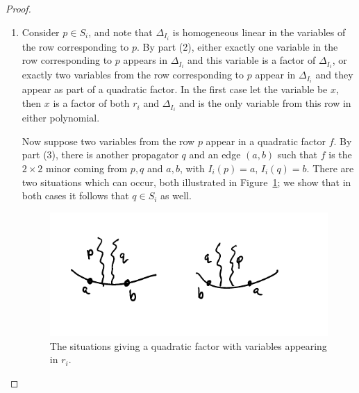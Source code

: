 \documentclass[11pt]{article}
\theoremstyle{remark}
\theoremstyle{definition}
\begin{document}
\begin{proof}
\begin{enumerate}
Now let $f$ be a quadratic factor of $\Delta_{I_i}$.  By part (2) we know that $f$ is a $2\times 2$ minor coming from two propagators, call them $p$ and $q$, and two vertices, call them $a <_i b$.  It remains to show that $a$ and $b$ are adjacent.  From this we can conclude that $p$ and $q$ each have one end on $(a,b)$, as any other way for both $p$ and $q$ to be supported on two consecutive vertices would contradict noncrossing or the density requirement of admissibility.

As in the proof of part (2), make a new admissible diagram by removing the propagators which come before $f$ and set $i=a$.  The cases in the proof of part (2) show how $\Delta_{I_i}$ factors: in particular the vertices supporting the other end of $p$ either do not appear in $I_i$, or they contribute to a different factor of $\Delta_{I_i}$ than $p$ and $a$ do.  By assumption $b$ contributes to the same factor as $a$.  Therefore $(a,b)$ is an edge.

\item Consider $p\in S_i$, and note that $\Delta_{I_i}$ is homogeneous linear in the variables of the row corresponding to $p$.  By part (2), either exactly one variable in the row corresponding to $p$ appears in $\Delta_{I_i}$ and this variable is a factor of $\Delta_{I_i}$, or exactly two variables from the row corresponding to $p$ appear in $\Delta_{I_i}$ and they appear as part of a quadratic factor.  In the first case let the variable be $x$, then $x$ is a factor of both $r_i$ and $\Delta_{I_i}$ and is the only variable from this row in either polynomial.  

Now suppose two variables from the row $p$ appear in a quadratic factor $f$.  By part (3), there is another propagator $q$ and an edge $(a,b)$ such that $f$ is the $2\times 2$ minor coming from $p, q$ and $a, b$, with $I_i(p)=a$, $I_i(q)=b$.  There are two situations which can occur, both illustrated in Figure~\ref{fig quadratic}; we show that in both cases it follows that $q \in S_i$ as well.

\begin{figure}
  \includegraphics{quadratic}
  \caption{The situations giving a quadratic factor with variables appearing in $r_i$.}\label{fig quadratic}
\end{figure}


\end{enumerate}
\end{proof}
\end{document}
